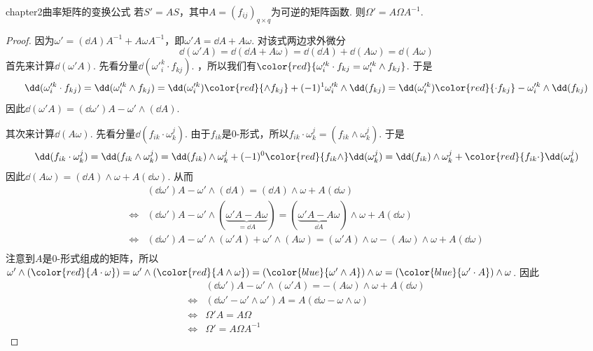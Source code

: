 \begin{mythm}{}{chapter2曲率矩阵的变换公式}
	若$S'=A  S$，其中$A=(f_{ij})_{q\times q }$为可逆的矩阵函数. 则$\Omega'=A \Omega  A^{-1}$.
\end{mythm}
\begin{proof}
	因为$\omega'=(\dd A)  A^{-1}+A   \omega  A^{-1} $，即$\omega'  A=\dd A+A   \omega$. 对该式两边求外微分
	\[
	\dd (\omega'  A)=\dd (\dd A+A   \omega)=\dd (\dd A)+\dd (A   \omega)=\dd (A   \omega)
	\]
	首先来计算$\dd (\omega' A)$. 先看分量$\dd (\omega'^{k}_{i}\cdot f_{kj})$. {}，所以我们有${\color{red}{\omega'^{k}_{i}\cdot f_{kj}=\omega'^{k}_{i}\wedge f_{kj}}}$. 于是
	\[
	\dd (\omega'^{k}_{i}\cdot f_{kj})=\dd(\omega'^{k}_{i}\wedge f_{kj})=\dd(\omega'^{k}_{i}){\color{red}{\wedge f_{kj}}}+(-1)^{1}\omega'^{k}_{i}\wedge \dd(f_{kj})=\dd(\omega'^{k}_{i}){\color{red}{\cdot f_{kj}}}-\omega'^{k}_{i}\wedge \dd(f_{kj})
	\]
	因此$\dd (\omega'  A)=(\dd\omega')  A-\omega'\wedge(\dd A)$. 
	
	其次来计算$\dd (A   \omega)$. 先看分量$\dd(f_{ik}\cdot \omega^{j}_{k} )$. 由于$f_{ik}$是0-形式，所以$f_{ik}\cdot \omega^{j}_{k} =(f_{ik}\wedge \omega^{j}_{k} )$. 于是
	\[
	\dd(f_{ik}\cdot \omega^{j}_{k} )=\dd(f_{ik}\wedge \omega^{j}_{k} )=\dd(f_{ik})\wedge \omega^{j}_{k}+(-1)^{0}{\color{red}{f_{ik}\wedge}} \dd (\omega^{j}_{k})=\dd(f_{ik})\wedge \omega^{j}_{k}+{\color{red}{f_{ik}\cdot}}  \dd (\omega^{j}_{k})
	\]
	因此$\dd (A   \omega)=(\dd A)\wedge \omega+A  (\dd\omega)$. 从而
	\[
	\begin{split}
	&(\dd\omega')  A-\omega'\wedge(\dd A)=(\dd A)\wedge \omega+A  (\dd\omega)\\
	\Leftrightarrow& (\dd\omega')  A-\omega'\wedge(\underbrace{\omega'  A-A  \omega}_{=\dd A})=(\underbrace{\omega'  A-A  \omega}_{\dd A})\wedge \omega+A  (\dd\omega)\\
	\Leftrightarrow& (\dd\omega')  A-\omega'\wedge(\omega'  A)+\omega'\wedge (A  \omega)=(\omega'  A)\wedge \omega-(A  \omega)\wedge\omega+A  (\dd\omega)\\
	\end{split}
	\]
	注意到$A$是0-形式组成的矩阵，所以$\omega'\wedge ({\color{red}{A\cdot \omega}})=\omega'\wedge ({\color{red}{A\wedge \omega}})=({\color{blue}{\omega'\wedge A}})\wedge \omega=({\color{blue}{\omega'\cdot A}})\wedge \omega$. 因此
	\[
	\begin{split}
	& (\dd\omega')  A-\omega'\wedge(\omega'  A)=-(A \omega)\wedge\omega+A  (\dd\omega)\\
	\Leftrightarrow& (\dd\omega'-\omega'\wedge\omega')   A=A  (\dd \omega-\omega\wedge\omega)\\
	\Leftrightarrow& \Omega'  A=A  \Omega\\
	\Leftrightarrow&\Omega'=A  \Omega  A^{-1}
	\end{split}
	\]
\end{proof}

